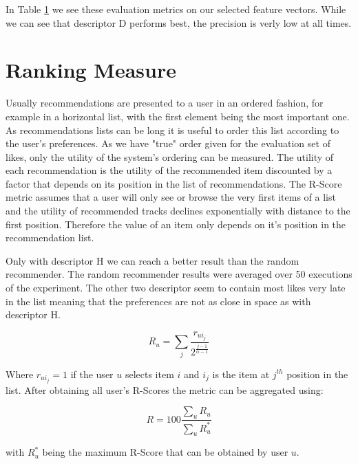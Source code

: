 \documentclass[cic,tc,english]{iiufrgs}
\begin{document}
\begin{table}
\begin{tabular}{| l | c | c | c |}
\end{tabular}
\label{tab:use}
\end{table}

In Table \ref{tab:use} we see these evaluation metrics on our selected feature vectors. While we can see that descriptor D performs best, the precision is verly low at all times. 

\section{Ranking Measure}
Usually recommendations are presented to a user in an ordered fashion, for example in a horizontal list, with the first element being the most important one. As recommendations lists can be long it is useful to order this list according to the user's preferences. As we have "true" order given for the evaluation set of likes, only the utility of the system's ordering can be measured. The utility of each recommendation is the utility of the recommended item discounted by a factor that depends on its position in the list of recommendations\cite{shani2011evaluating}. The R-Score metric assumes that a user will only see or browse the very first items of a list and the utility of recommended tracks declines exponentially with distance to the first position. Therefore the value of an item only depends on it's position in the recommendation list.

Only with descriptor H we can reach a better result than the random recommender. The random recommender results were averaged over 50 executions of the experiment. The other two descriptor seem to contain most likes very late in the list meaning that the preferences are not as close in space as with descriptor H.

\begin{equation}
R_u = \sum_j \frac{r_{ui_j}}{2^{\frac{j-1}{\alpha - 1}}}
\end{equation}

Where $r_{ui_j} = 1$ if the user $u$ selects item $i$ and $i_j$ is the item at $j^{th}$ position in the list. After obtaining all user's R-Scores the metric can be aggregated using:

\begin{equation}
R =100 \frac{\sum_u R_u}{\sum_u R^*_u}
\end{equation}

with $R^*_u$ being the maximum R-Score that can be obtained by user $u$.
\end{document}
